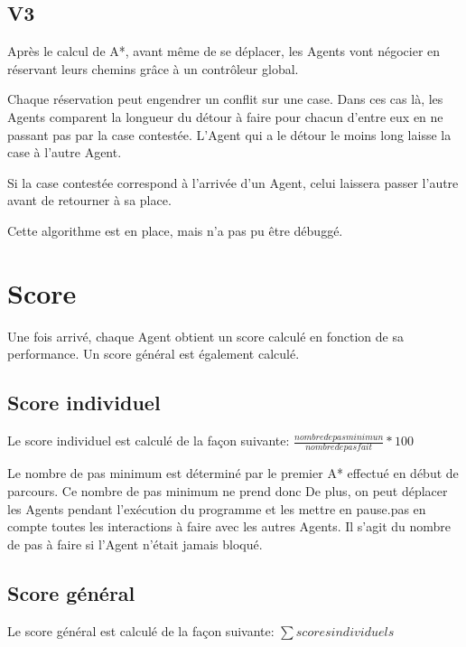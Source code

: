 \documentclass[11pt]{article}
\begin{document}
  \subsection{V3}
  
  Après le calcul de A*, avant même de se déplacer, les Agents vont négocier en réservant leurs chemins grâce à un contrôleur global.
  
  Chaque réservation peut engendrer un conflit sur une case. 
  Dans ces cas là, les Agents comparent la longueur du détour à faire pour chacun d'entre eux en ne passant pas par la case contestée.
  L'Agent qui a le détour le moins long laisse la case à l'autre Agent.
  
  Si la case contestée correspond à l'arrivée d'un Agent, celui laissera passer l'autre avant de retourner à sa place.
  
  Cette algorithme est en place, mais n'a pas pu être débuggé.

  \section{Score}
  
  Une fois arrivé, chaque Agent obtient un score calculé en fonction de sa performance.
  Un score général est également calculé.
  
  \subsection{Score individuel}
  
  Le score individuel est calculé de la façon suivante:   
  \begin{math} \frac{nombre de pas minimun}{nombre de pas fait} * 100\end{math} 
  
  Le nombre de pas minimum est déterminé par le premier A* effectué en début de parcours. 
  Ce nombre de pas minimum ne prend donc 
  De plus, on peut déplacer les Agents pendant l'exécution du programme et les mettre en pause.pas en compte toutes les interactions à faire avec les autres Agents. 
  Il s'agit du nombre de pas à faire si l'Agent n'était jamais bloqué.
  
  \subsection{Score général}
  
  Le score général est calculé de la façon suivante: 
  \begin{math} \sum scores individuels\end{math} 
  
\end{document}
